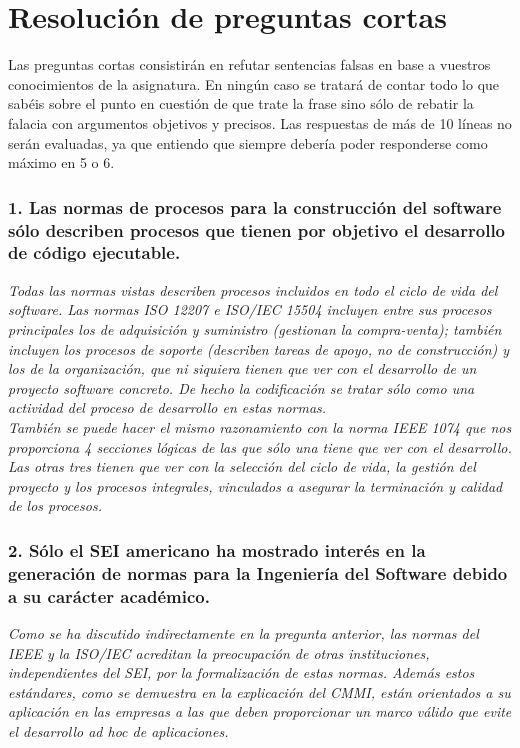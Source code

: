 
\section{Resolución de preguntas cortas}
Las preguntas cortas consistirán en refutar sentencias falsas en base a vuestros conocimientos de la asignatura. En ningún caso se tratará de contar todo lo que sabéis sobre el punto en cuestión de que trate la frase sino sólo de rebatir la falacia con argumentos objetivos y precisos. Las respuestas de más de 10 líneas no serán evaluadas, ya que entiendo que siempre debería poder responderse como máximo en 5 o 6.

\subsubsection*{1. Las normas de procesos para la construcción del software sólo describen procesos que tienen por objetivo el desarrollo de código ejecutable.}
\textit{Todas las normas vistas describen procesos incluidos en todo el ciclo de vida del software. Las normas ISO 12207 e ISO/IEC 15504 incluyen entre sus procesos principales los de adquisición y suministro (gestionan la compra-venta); también incluyen los procesos de soporte (describen tareas de apoyo, no de construcción) y los de la organización, que ni siquiera tienen que ver con el desarrollo de un proyecto software concreto. De hecho la codificación se tratar sólo como una actividad del proceso de desarrollo en estas normas.
    \\
    También se puede hacer el mismo razonamiento con la norma IEEE 1074 que nos proporciona 4 secciones lógicas de las que sólo una tiene que ver con el desarrollo. Las otras tres tienen que ver con la selección del ciclo de vida, la gestión del proyecto y los procesos integrales, vinculados a asegurar la terminación y calidad de los procesos.}

\subsubsection*{2. Sólo el SEI americano ha mostrado interés en la generación de normas para la Ingeniería del Software debido a su carácter académico.}
\textit{Como se ha discutido indirectamente en la pregunta anterior, las normas del IEEE y la ISO/IEC acreditan la preocupación de otras instituciones, independientes del SEI, por la formalización de estas normas. Además estos estándares, como se demuestra en la explicación del CMMI, están orientados a su aplicación en las empresas a las que deben proporcionar un marco válido que evite el desarrollo ad hoc de aplicaciones.}

